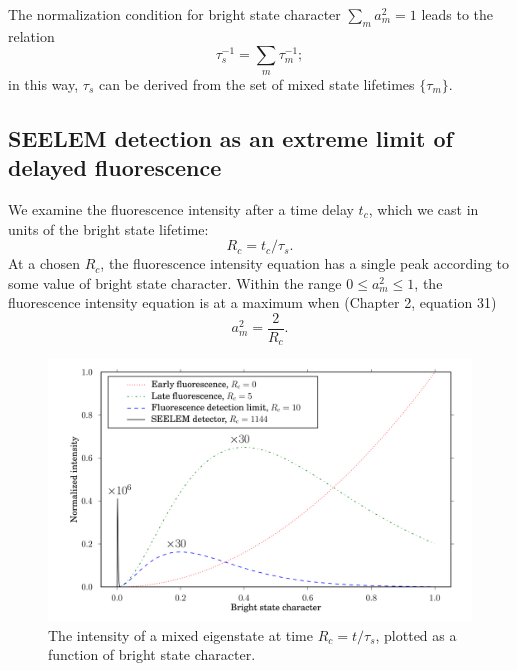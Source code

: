 \documentclass[12pt,draft]{mitthesis}
\begin{document}
The normalization condition for bright state character $\sum_m a_m^2 =
1$ leads to the relation
\begin{equation}
  \tau_s^{-1} = \sum_m \tau_m^{-1};
\end{equation}
in this way, $\tau_s$ can be derived from the set of mixed state
lifetimes $\lbrace \tau_m \rbrace$.

\subsection{SEELEM detection as an extreme limit of delayed fluorescence}

We examine the fluorescence intensity after a time delay $t_c$,
which we cast in units of the bright state lifetime:
\begin{equation}
  R_c = t_c / \tau_s.
\end{equation}
At a chosen $R_c$, the fluorescence intensity equation has a single
peak according to some value of bright state character.  Within the
range $0 \le a_m^2 \le 1$, the fluorescence intensity equation is at a
maximum when (Chapter 2, equation 31)
\begin{equation}
  \label{eq:am-max}
  a_m^2 = \frac{2}{R_c}.
\end{equation}

\begin{figure}
  \caption{The intensity of a mixed eigenstate at time $R_c =
    t/\tau_s$, plotted as a function of bright
    state character.}
  \label{fig:int-at-rc}
  \centering
  \includegraphics[width=7.5in,angle=90]{intensity-at-rc.png}
\end{figure}
\end{document}
